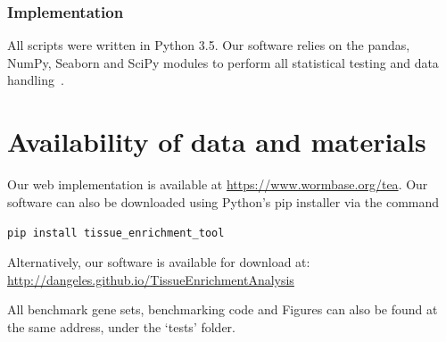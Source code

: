 \documentclass{bmcart}
\begin{document}
\subsubsection*{Implementation}
All scripts were written in Python 3.5. Our software relies on the pandas, NumPy, Seaborn and SciPy modules to perform all statistical testing and data handling~\cite{McKinney2011, VanDerWalt2011, Oliphant2007}.


\section*{Availability of data and materials}
Our web implementation is available at \url{https://www.wormbase.org/tea}. Our software can also be downloaded using Python's pip installer via the command

\texttt{pip install tissue\_enrichment\_tool}

Alternatively, our software is available for download at: \url{http://dangeles.github.io/TissueEnrichmentAnalysis}

All benchmark gene sets, benchmarking code and Figures can also be found at the same address, under the `tests' folder.
\end{document}
